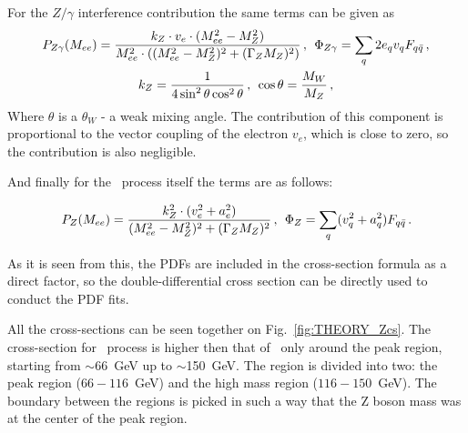 For the $Z/\gamma$ interference contribution the same terms can be given as
\begin{equation}
\begin{gathered}
P_{Z\gamma}(M_{ee}) = \frac{k_{Z} \cdot v_{e} \cdot (M_{ee}^{2} - M_{Z}^{2})}{M_{ee}^{2} \cdot ((M_{ee}^{2} - M_{Z}^{2})^{2} + (\Gamma_{Z}M_{Z})^{2})}\,,\,\;
\Phi_{Z\gamma} = \sum_{q} 2e_{q}v_{q} F_{q\bar{q}} \,,\\
k_{Z} = \frac{1}{4\sin^{2}\theta\cos^{2}\theta} \,, \,\; \cos\theta = \frac{M_{W}}{M_{Z}} \,,
\end{gathered}
\end{equation}
Where $\theta$ is a $\theta_{W}$ - a weak mixing angle. The contribution of this component is proportional to the vector coupling of the electron $v_{e}$, which is close to zero, so the contribution is also negligible.

And finally for the \Zee\ process itself the terms are as follows:

\begin{equation}
P_{Z}(M_{ee}) = \frac{k^{2}_{Z} \cdot (v^{2}_{e} + a^{2}_{e})}{(M^{2}_{ee} - M^{2}_{Z})^{2} + (\Gamma_{Z}M_{Z})^{2}}\,,\,\;
\Phi_{Z} = \sum_{q} (v^{2}_{q} + a^{2}_{q}) F_{q\bar{q}} \,.
\end{equation}

As it is seen from this, the PDFs are included in the cross-section formula as a direct factor, so the double-differential cross section can be directly used to conduct the PDF fits.

\begin{figure}
\end{figure}

All the cross-sections can be seen together on Fig.~\ref{fig:THEORY_Zcs}. The cross-section for \Zee\ process is higher then that of \gee\ only around the peak region, starting from $\sim$66~GeV up to $\sim$150~GeV. The region is divided into two: the peak region ($66 - 116$~GeV) and the high mass region ($116 - 150$~GeV). The boundary between the regions is picked in such a way that the Z boson mass was at the center of the peak region.


